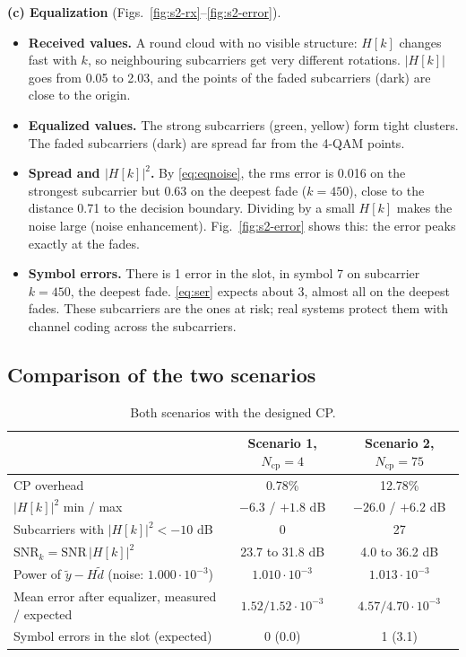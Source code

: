 \documentclass[11pt,a4paper]{article}
\newcommand{\Ncp}{N_{\mathrm{cp}}}
\newcommand{\SNR}{\mathrm{SNR}}
\newcommand{\yt}{\tilde{y}}
\newcommand{\dt}{\tilde{d}}
\begin{document}
\textbf{(c) Equalization} (Figs.~\ref{fig:s2-rx}--\ref{fig:s2-error}).
\begin{itemize}
  \item \textbf{Received values.} A round cloud with no visible structure: $H[k]$ changes fast with $k$,
        so neighbouring subcarriers get very different rotations. $|H[k]|$ goes from 0.05 to 2.03, and the
        points of the faded subcarriers (dark) are close to the origin.
  \item \textbf{Equalized values.} The strong subcarriers (green, yellow) form tight clusters. The
        faded subcarriers (dark) are spread far from the 4-QAM points.
  \item \textbf{Spread and $|H[k]|^2$.} By \eqref{eq:eqnoise}, the rms error is 0.016 on the strongest
        subcarrier but 0.63 on the deepest fade ($k = 450$), close to the distance 0.71 to the decision
        boundary. Dividing by a small $H[k]$ makes the noise large (noise enhancement).
        Fig.~\ref{fig:s2-error} shows this: the error peaks exactly at the fades.
  \item \textbf{Symbol errors.} There is 1 error in the slot, in symbol 7 on subcarrier $k = 450$, the
        deepest fade. \eqref{eq:ser} expects about 3, almost all on the deepest fades. These subcarriers are
        the ones at risk; real systems protect them with channel coding across the subcarriers.
\end{itemize}

\FloatBarrier
\subsection{Comparison of the two scenarios}

\begin{table}[!htb]
  \centering
  \caption{Both scenarios with the designed CP.}
  \label{tab:compare}
  \small
  \begin{tabular}{lcc}
    \toprule
    & Scenario 1, $\Ncp = 4$ & Scenario 2, $\Ncp = 75$ \\
    \midrule
    CP overhead                                     & 0.78\%                & 12.78\% \\
    $|H[k]|^2$ min / max                            & $-6.3$ / $+1.8$ dB    & $-26.0$ / $+6.2$ dB \\
    Subcarriers with $|H[k]|^2 < -10$ dB            & 0                     & 27 \\
    $\SNR_k = \SNR\,|H[k]|^2$                       & 23.7 to 31.8 dB       & 4.0 to 36.2 dB \\
    Power of $\yt - H\dt$ (noise: $1.000 \cdot 10^{-3}$) & $1.010 \cdot 10^{-3}$ & $1.013 \cdot 10^{-3}$ \\
    Mean error after equalizer, measured / expected & $1.52 / 1.52 \cdot 10^{-3}$   & $4.57 / 4.70 \cdot 10^{-3}$ \\
    Symbol errors in the slot (expected)            & 0 (0.0)               & 1 (3.1) \\
    \bottomrule
  \end{tabular}
\end{table}
\end{document}
